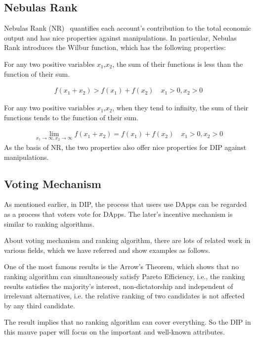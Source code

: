 \subsection{Nebulas Rank}
Nebulas Rank (NR)~\cite{Nebulasyellowpaper} quantifies each account's contribution to the total economic output and has nice properties against manipulations. In particular, Nebulas Rank introduces the Wilbur function, which has the following properties:

\begin{property}
	\label{prop:one}
	For any two positive variables $x_1$,$x_2$, the sum of their functions is less than the function of their sum.
\end{property}
\begin{align}
	f(x_1+x_2)>f(x_1)+f(x_2) \quad x_1>0,x_2>0
\end{align}
\begin{property}
	\label{prop:two}
	For any two positive variables $x_1$,$x_2$, when they tend to infinity, the sum of their functions tends to the function of their sum.
\end{property}

\begin{align}
	\lim\limits_{x_1 \to \infty, x_2\to \infty} f(x_1+x_2) = f(x_1) + f(x_2)\quad x_1>0, x_2>0
\end{align}
\noindent As the basis of NR, the two properties also offer nice properties for DIP against manipulations.

\subsection{Voting Mechanism}
As mentioned earlier, in DIP, the process that users use DApps can be regarded as a process that voters vote for DApps. The later's incentive mechanism is similar to ranking algorithms.

About voting mechanism and ranking algorithm, there are lots of related work in various fields, which we have referred and show examples as follows.

One of the most famous results is the Arrow's Theorem, which shows that no ranking algorithm can simultaneously satisfy Pareto Efficiency, i.e., the ranking results satisfies the majority's interest, non-dictatorship and independent of irrelevant alternatives, i.e. the relative ranking of two candidates is not affected by any third candidate.

The result implies that no ranking algorithm can cover everything. So the DIP
in this mauve paper will focus on the important and well-known attributes.

